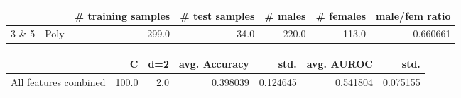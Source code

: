 \begin{tabular}{lrrrrr}
\hline
{} &  \# training samples &  \# test samples &  \# males &  \# females &  male/fem ratio \\
\hline
3 \& 5 - Poly &               299.0 &            34.0 &    220.0 &      113.0 &        0.660661 \\
\hline
\end{tabular}
\begin{tabular}{lrrrrrr}
\hline
{} &      C &  d=2 &  avg. Accuracy &      std. &  avg. AUROC &      std. \\
\hline
All features combined &  100.0 &  2.0 &       0.398039 &  0.124645 &    0.541804 &  0.075155 \\
\hline
\end{tabular}

